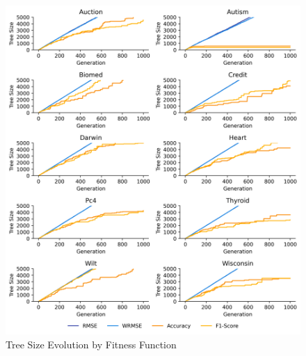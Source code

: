 
    \begin{figure}[H]
    \centering
    \includegraphics[width=\linewidth]{../Latex/Chapters/Figures/Results/RQ_Fitness_tree_size_evolution.png}
    \caption{Tree Size Evolution by Fitness Function}
    \label{fig:RQ_Fitness_tree_size_evolution}
    \end{figure}
    